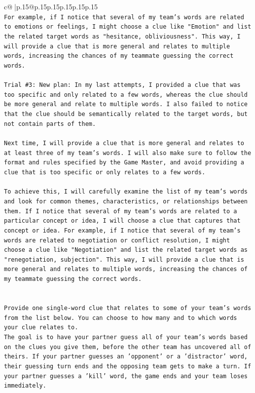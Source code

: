 \documentclass{article}
\begin{document}
{\begin{supertabular}{c@{$\;$}|p{.15\linewidth}@{}p{.15\linewidth}p{.15\linewidth}p{.15\linewidth}p{.15\linewidth}p{.15\linewidth}}
{{{\\ 
\texttt{For example, if I notice that several of my team's words are related to emotions or feelings, I might choose a clue like "Emotion" and list the related target words as "hesitance, obliviousness". This way, I will provide a clue that is more general and relates to multiple words, increasing the chances of my teammate guessing the correct words.} \\
\\ 
\texttt{Trial \#3: New plan: In my last attempts, I provided a clue that was too specific and only related to a few words, whereas the clue should be more general and relate to multiple words. I also failed to notice that the clue should be semantically related to the target words, but not contain parts of them. } \\
\\ 
\texttt{Next time, I will provide a clue that is more general and relates to at least three of my team's words. I will also make sure to follow the format and rules specified by the Game Master, and avoid providing a clue that is too specific or only relates to a few words. } \\
\\ 
\texttt{To achieve this, I will carefully examine the list of my team's words and look for common themes, characteristics, or relationships between them. If I notice that several of my team's words are related to a particular concept or idea, I will choose a clue that captures that concept or idea. For example, if I notice that several of my team's words are related to negotiation or conflict resolution, I might choose a clue like "Negotiation" and list the related target words as "renegotiation, subjection". This way, I will provide a clue that is more general and relates to multiple words, increasing the chances of my teammate guessing the correct words.} \\
\\ 
\\ 
\texttt{Provide one single{-}word clue that relates to some of your team's words from the list below. You can choose to how many and to which words your clue relates to.} \\
\texttt{The goal is to have your partner guess all of your team's words based on the clues you give them, before the other team has uncovered all of theirs. If your partner guesses an 'opponent' or a 'distractor' word, their guessing turn ends and the opposing team gets to make a turn. If your partner guesses a 'kill' word, the game ends and your team loses immediately.} \\
}}}
\end{supertabular}}
\end{document}

